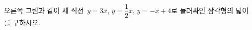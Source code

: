\noindent\begin{minipage}[t]{0.58\linewidth}\vspace{0pt}오른쪽 그림과 같이 세 직선~$y=3x$, $y=\dfrac{1}{2}x$, $y=-x+4$로 둘러싸인 삼각형의 넓이를 구하시오.\end{minipage}\hfill\begin{minipage}[t]{0.4\linewidth}\vspace{0pt}\centering \end{minipage}\par
